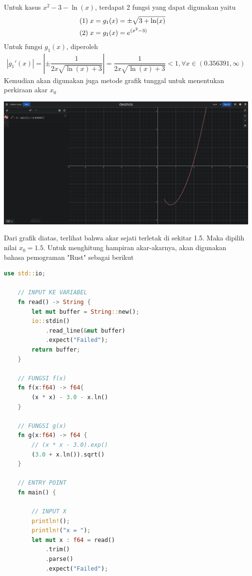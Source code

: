 \documentclass[12pt]{article}
\begin{document}
\begin{enumerate}
{        Untuk kasus $ x^2 - 3 - \ln(x) $, terdapat 2 fungsi yang dapat digunakan yaitu
        \begin{align*}
            (1)\;   & x = g_1(x) = \pm\sqrt{3 + \ln(x)}  &\\
            (2)\;   & x = g_1(x) = e^{(x^2 - 3)}
        \end{align*}
        Untuk fungsi $ g_1(x) $, diperoleh
        \begin{align*}
            |g_1'(x)| = \left|\pm\dfrac{1}{2x\sqrt{\ln\left(x\right)+3}}\right| = \dfrac{1}{2x\sqrt{\ln\left(x\right)+3}} < 1, \forall x \in (0.356391, \infty)
        \end{align*}
        Kemudian akan digunakan juga metode grafik tunggal untuk menentukan perkiraan akar $ x_0 $
        \begin{center}
            \includegraphics[scale=0.2]{gambar_1.png}  
        \end{center}
        Dari grafik diatas, terlihat bahwa akar sejati terletak di sekitar 1.5. Maka dipilih nilai $ x_0 = 1.5 $. Untuk menghitung hampiran akar-akarnya, akan digunakan bahasa pemograman "Rust" sebagai berikut
        \begin{lstlisting}[language=Rust, style=colouredRust]
    use std::io;

    // INPUT KE VARIABEL
    fn read() -> String {
        let mut buffer = String::new();
        io::stdin()
            .read_line(&mut buffer)
            .expect("Failed");
        return buffer;
    }
    
    // FUNGSI f(x)
    fn f(x:f64) -> f64{
        (x * x) - 3.0 - x.ln() 
    }

    // FUNGSI g(x)
    fn g(x:f64) -> f64 {
        // (x * x - 3.0).exp()
        (3.0 + x.ln()).sqrt()
    }

    // ENTRY POINT
    fn main() {
        
        // INPUT X
        println!();
        println!("x = ");
        let mut x : f64 = read()
            .trim()
            .parse()
            .expect("Failed");


\end{lstlisting}}
\end{enumerate}
\end{document}

